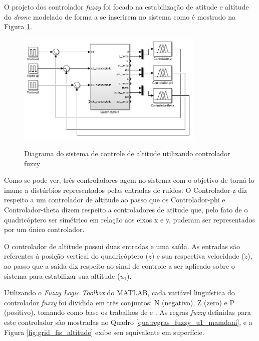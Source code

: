 O projeto dos controlador \textit{fuzzy} foi focado na estabilização de atitude e altitude do \textit{drone} modelado de forma a se inserirem no sistema como é mostrado na Figura \ref{fig:diagrama_sistema_controlado}.

\begin{figure}[!htb]
    \centering
    \caption{Diagrama do sistema de controle de altitude utilizando controlador fuzzy}
    \includegraphics[width=0.8\textwidth]{./04-figuras/figuras_pos_banca/2-sistema_completo_controlado/diagrama_sistema_controlado}
    \label{fig:diagrama_sistema_controlado}
\end{figure}

Como se pode ver, três controladores agem no sistema com o objetivo de torná-lo imune a distúrbios representados pelas entradas de ruídos. O {\ttfamily Controlador-z} diz respeito a um controlador de altitude ao passo que os {\ttfamily Controlador-phi} e {\ttfamily Controlador-theta} dizem respeito a controladores de atitude que, pelo fato de o quadricóptero ser simétrico em relação aos eixos x e y, puderam ser representados por um único controlador.

O controlador de altitude possui duas entradas e uma saída. As entradas são referentes à posição vertical do quadricóptero ($z$) e sua respectiva velocidade ($\dot{z}$), ao passo que a saída diz respeito ao sinal de controle a ser aplicado sobre o sistema para estabilizar sua altitude ($u_1$).

Utilizando o \textit{Fuzzy Logic Toolbox} do MATLAB, cada variável linguística do controlador \textit{fuzzy} foi dividida em três conjuntos: N (negativo), Z (zero) e P (positivo), tomando como base os trabalhos de  e . As regras \textit{fuzzy} definidas para este controlador são mostradas no Quadro \ref{qua:regras_fuzzy_u1_mamdani}, e a Figura \ref{fig:grid_fis_altitude} exibe seu equivalente em superfície.


